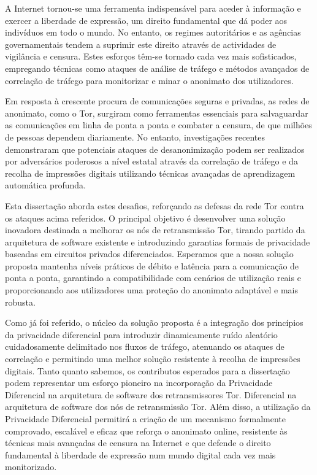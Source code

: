 
%


A Internet tornou-se uma ferramenta indispensável para aceder à informação e exercer a liberdade de expressão, um direito fundamental que dá poder aos indivíduos em todo o mundo. No entanto, os regimes autoritários e as agências governamentais tendem a suprimir este direito através de actividades de vigilância e censura. Estes esforços têm-se tornado cada vez mais sofisticados, empregando técnicas como ataques de análise de tráfego e métodos avançados de correlação de tráfego para monitorizar e minar o anonimato dos utilizadores.

Em resposta à crescente procura de comunicações seguras e privadas, as redes de anonimato, como o Tor, surgiram como ferramentas essenciais para salvaguardar as comunicações em linha de ponta a ponta e combater a censura, de que milhões de pessoas dependem diariamente. No entanto, investigações recentes demonstraram que potenciais ataques de desanonimização podem ser realizados por adversários poderosos a nível estatal através da correlação de tráfego e da recolha de impressões digitais utilizando técnicas avançadas de aprendizagem automática profunda.

Esta dissertação aborda estes desafios, reforçando as defesas da rede Tor contra os ataques acima referidos. O principal objetivo é desenvolver uma solução inovadora destinada a melhorar os nós de retransmissão Tor, tirando partido da arquitetura de software existente e introduzindo garantias formais de privacidade baseadas em circuitos privados diferenciados. Esperamos que a nossa solução proposta mantenha níveis práticos de débito e latência para a comunicação de ponta a ponta, garantindo a compatibilidade com cenários de utilização reais e proporcionando aos utilizadores uma proteção do anonimato adaptável e mais robusta.

Como já foi referido, o núcleo da solução proposta é a integração dos princípios da privacidade diferencial para introduzir dinamicamente ruído aleatório cuidadosamente delimitado nos fluxos de tráfego, atenuando os ataques de correlação e permitindo uma melhor solução resistente à recolha de impressões digitais. 
Tanto quanto sabemos, os contributos esperados para a dissertação podem representar um esforço pioneiro na incorporação da Privacidade Diferencial na arquitetura de software dos retransmissores Tor.
Diferencial na arquitetura de software dos nós de retransmissão Tor. Além disso, a utilização da Privacidade Diferencial permitirá a criação de um mecanismo formalmente comprovado, escalável e eficaz que reforça o anonimato online, resistente às técnicas mais avançadas de censura na Internet e que defende o direito fundamental à liberdade de expressão num mundo digital cada vez mais monitorizado.



